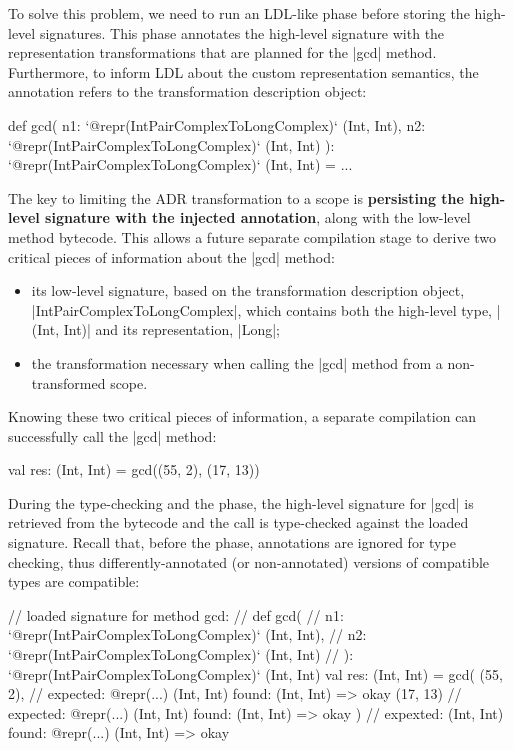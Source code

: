 To solve this problem, we need to run an LDL-like \inject{} phase before storing the high-level signatures. This phase annotates the high-level signature with the representation transformations that are planned for the |gcd| method. Furthermore, to inform LDL about the custom representation semantics, the annotation refers to the transformation description object:

\begin{lstlisting-nobreak}
def gcd(
    n1: `@repr(IntPairComplexToLongComplex)` (Int, Int),
    n2: `@repr(IntPairComplexToLongComplex)` (Int, Int)
  ): `@repr(IntPairComplexToLongComplex)` (Int, Int) = ...
\end{lstlisting-nobreak}

The key to limiting the ADR transformation to a scope is \textbf{persisting the high-level signature with the injected annotation}, along with the low-level method bytecode. This allows a future separate compilation stage to derive two critical pieces of information about the |gcd| method:

\begin{itemize}
  \item its low-level signature, based on the transformation description object, \\ |IntPairComplexToLongComplex|, which contains both the high-level type, |(Int, Int)| and its representation, |Long|;
  \item the transformation necessary when calling the |gcd| method from a non-transformed scope.
\end{itemize}

Knowing these two critical pieces of information, a separate compilation can successfully call the |gcd| method:

\begin{lstlisting-nobreak}
val res: (Int, Int) = gcd((55, 2), (17, 13))
\end{lstlisting-nobreak}

During the type-checking and the \inject{} phase, the high-level
signature for |gcd| is retrieved from the bytecode and the call is
type-checked against the loaded signature. Recall that, before the
\coerce{} phase, annotations are ignored for type checking, thus
differently-annotated (or non-annotated) versions of compatible types
are compatible:

\begin{lstlisting-nobreak}
// loaded signature for method gcd:
//  def gcd(
//      n1: `@repr(IntPairComplexToLongComplex)` (Int, Int),
//      n2: `@repr(IntPairComplexToLongComplex)` (Int, Int)
//    ): `@repr(IntPairComplexToLongComplex)` (Int, Int)
val res: (Int, Int) =
  gcd(
    (55, 2),   // expected: @repr(...) (Int, Int) found: (Int, Int) => okay
    (17, 13)  // expected: @repr(...) (Int, Int) found: (Int, Int) => okay
  )             // expexted: (Int, Int) found: @repr(...) (Int, Int) => okay
\end{lstlisting-nobreak}

